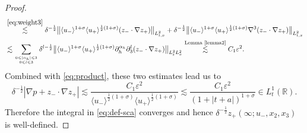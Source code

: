 \documentclass[10pt,reqno]{amsart}
\numberwithin{equation}{section}
\begin{document}
\begin{proof}
\begin{align*}
	&\stackrel{\eqref{eq:weight3}}{\lesssim}\delta^{-\frac{1}{2}}\big\|\langle u_-\rangle^{1+\sigma}\langle u_+\rangle^{\frac{1}{2}(1+\sigma)} (z_-\cdot\nabla z_+)\big\|_{L^2_{t,x}}+\delta^{-\frac{1}{2}}\big\|\langle u_-\rangle^{1+\sigma}\langle u_+\rangle^{\frac{1}{2}(1+\sigma)} \nabla^3 (z_-\cdot\nabla z_+)\big\|_{L^2_{t,x}}\\
	&\lesssim
	\sum_{0\leqslant|\alpha_h|\leqslant 3\atop 0\leqslant l\leqslant 3}\delta^{l-\frac{1}{2}}\big\|\langle u_-\rangle^{1+\sigma}\langle u_+\rangle^{\frac{1}{2}(1+\sigma)}\partial_{h}^{\alpha_h}\partial_3^l (z_-\cdot\nabla z_+)\big\|_{L^2_tL^2_x}
	\stackrel{\text{Lemma \ref{lemma2}}}{\lesssim}C_1\varepsilon^2.
\end{align*}
Combined with \eqref{eq:product}, these two estimates lead us to 
\begin{equation*}
\delta^{-\frac{1}{2}}|\nabla p+z_-\cdot \nabla z_+|\lesssim\frac{C_1\varepsilon^2}{\langle u_-\rangle^{\frac{1}{2}(1+\sigma)}\langle u_+\rangle^{\frac{1}{2}(1+\sigma)}}\lesssim\frac{C_1\varepsilon^2}{(1+|t+a|)^{1+\sigma}}\in L_t^1(\mathbb{R}).
\end{equation*}
Therefore the integral in \eqref{eq:def-sca} converges and hence $\delta^{-\frac{1}{2}}z_{+}(\infty;u_-,x_2,x_3)$ is well-defined. 
\end{proof}
 
\end{document}
